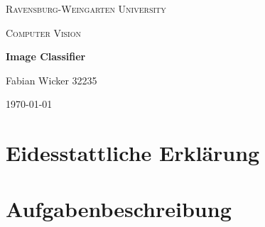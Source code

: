 \documentclass{scrartcl}
\begin{document}
	\begin{titlepage}
		\centering
		{\scshape\LARGE Ravensburg-Weingarten University\par}
		\vspace{1.5cm}
		\begin{figure}[hb]
			\centering
			\rwulogo[width=0.4\columnwidth]
		\end{figure}

		\vspace{5cm}
		{\scshape\Large Computer Vision\par}
		\vspace{0.25cm}
		{\huge\bfseries Image Classifier\par}
		\vspace{6cm}
		{\Large Fabian Wicker 32235\par}
		\vfill
		{\large \today\par}
	\end{titlepage}
	\clearpage 
	\section{Eidesstattliche Erklärung}
		
	\clearpage
	\section{Aufgabenbeschreibung}
		
	\clearpage
	\tableofcontents
	\clearpage
	\listoffigures
	\clearpage
	\listoftables
	\clearpage
	\clearpage
\end{document}
